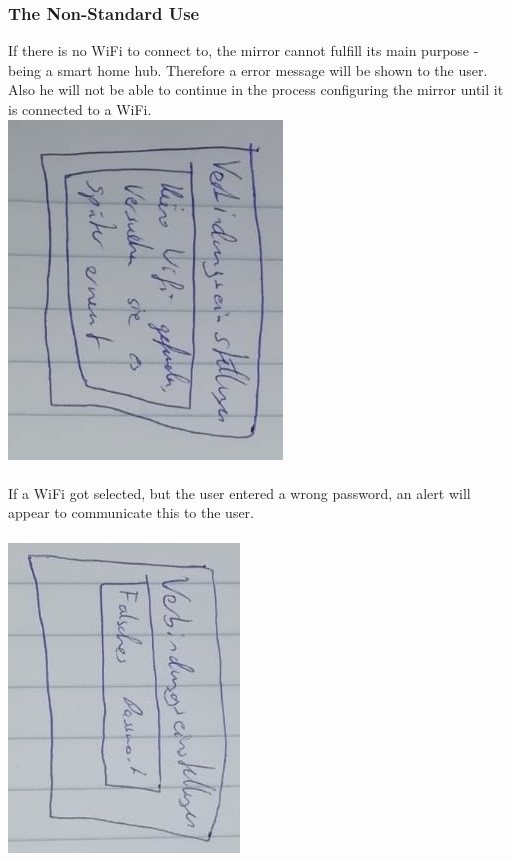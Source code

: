 \documentclass[12pt]{article}
\theoremstyle{definition}
\begin{document}
\subsubsection{The Non-Standard Use}
If there is no WiFi to connect to, the mirror cannot fulfill its main purpose - being a smart home hub.
Therefore a error message will be shown to the user. Also he will not be able to continue in the process configuring the mirror until it is connected to a WiFi.\\
\includegraphics[angle=90, scale=.8]{UseCase/KeinWifiGefunden.jpeg}\\\\
If a WiFi got selected, but the user entered a wrong password, an alert will appear to communicate this to the user.\\\\
\includegraphics[angle=90, scale=.8]{UseCase/VerbindungFalschesPasswort.jpeg}\\
\end{document}
